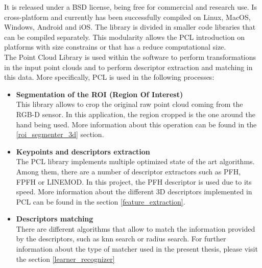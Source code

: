 It is released under a BSD license, being free for commercial and research use. Is cross-platform and currently has been successfully compiled on Linux, MacOS, Windows, Android and iOS.
The library is divided in smaller code libraries that can be compiled separately. This modularity allows the PCL introduction on platforms with size constrains or that has a reduce computational size. \cite{Rusu_ICRA2011_PCL}
\\




		The Point Cloud Library is used within the software to perform transformations in the input point clouds and to perform descriptor extraction and matching in this data. 
		More specifically, PCL is used in the following processes: 

		\begin{itemize}
			\item{\textbf{Segmentation of the ROI (Region Of Interest)\\ }}
			This library allows to crop the original raw point cloud coming from the RGB-D sensor. In this application, the region cropped is the one around the hand being used. More information about this operation can be found in the \ref{roi_segmenter_3d} section. 
			

			\item{\textbf{ Keypoints and descriptors extraction\\ }}
			 The PCL library implements multiple optimized state of the art algorithms. Among them, there are a number of descriptor extractors such as PFH, FPFH or LINEMOD. In this project, the PFH descriptor is used due to its speed. More information about the different 3D descriptors implemented in PCL can be found in the section  \ref{feature_extraction}.


			\item {\textbf{Descriptors matching\\ }}
			There are different algorithms that allow to match the information provided by the descriptors, such as knn search or radius search. For further information about the type of matcher used in the present thesis, please visit the section \ref{learner_recognizer}
		\end{itemize}






